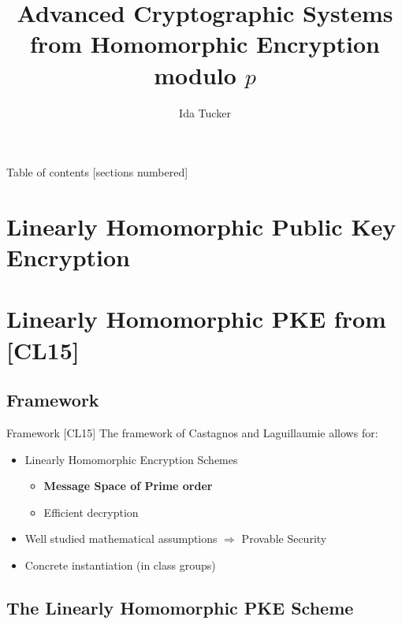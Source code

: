 \documentclass[10pt]{beamer}
\title{Advanced Cryptographic Systems\\ 
from Homomorphic Encryption modulo \texorpdfstring{$p$}{p}}
\date{}
\author{Ida Tucker\inst{}}
\institute{\inst{}Guilhem Castagnos \& Fabien Laguillaumie
}
\begin{document}
\maketitle

\begin{frame}{Table of contents}
  [sections numbered]
  \tableofcontents[hideallsubsections]
\end{frame}

\section{Linearly Homomorphic Public Key Encryption}



\section{Linearly Homomorphic PKE from [CL15]}
\subsection{Framework}
\begin{frame}{Framework [CL15]}
The framework of Castagnos and Laguillaumie allows for:
\begin{itemize}
\item Linearly Homomorphic Encryption Schemes
\begin{itemize}
\item \textbf{Message Space of Prime order}
\item Efficient decryption
\end{itemize}
\item Well studied mathematical assumptions $\Rightarrow$ Provable Security
\item Concrete instantiation (in class groups)
\end{itemize}
\end{frame}





\subsection{The Linearly Homomorphic PKE Scheme}




\end{document}
